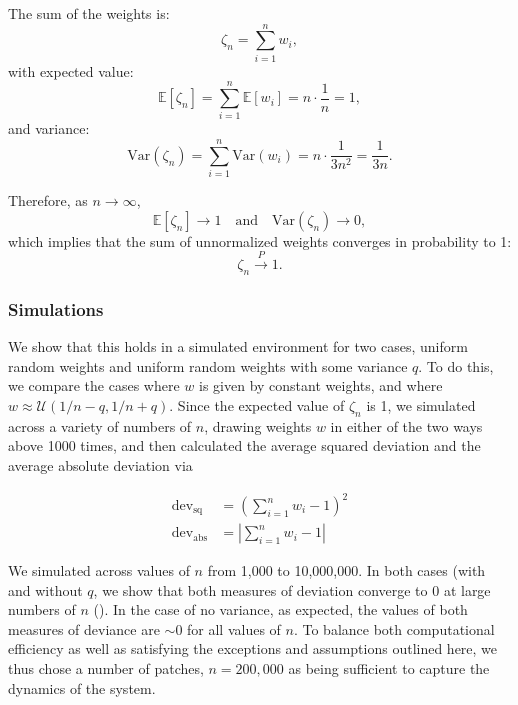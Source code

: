 The sum of the weights is:
\begin{equation}
\zeta_n = \sum_{i=1}^{n} w_i,
\end{equation}
with expected value:
\begin{equation}
\mathbb{E}[\zeta_n] = \sum_{i=1}^{n} \mathbb{E}[w_i] = n \cdot \frac{1}{n} = 1,
\end{equation}
and variance:
\begin{equation}
\text{Var}(\zeta_n) = \sum_{i=1}^{n} \text{Var}(w_i) = n \cdot \frac{1}{3n^2} = \frac{1}{3n}.
\end{equation}

Therefore, as \( n \to \infty \),
\begin{equation}
\mathbb{E}[\zeta_n] \to 1 \quad \text{and} \quad \text{Var}(\zeta_n) \to 0,
\end{equation}
which implies that the sum of unnormalized weights converges in probability to 1:
\begin{equation}
\zeta_n \xrightarrow{P} 1.
\end{equation}

\subsubsection*{Simulations}

We show that this holds in a simulated environment for two cases, uniform random weights and uniform random weights with some variance $q$. To do this, we compare the cases where $w$ is given by constant weights, and where $w \approx  \mathcal{U}(1/n-q,1/n+q)$. Since the expected value of $\zeta_n$ is 1, we simulated across a variety of numbers of $n$, drawing weights $w$ in either of the two ways above 1000 times, and then calculated the average squared deviation and the average absolute deviation via 

\begin{equation}
    \begin{aligned}
    \text{dev}_{\text{sq}} &= \left( \sum_{i=1}^n w_i - 1\right) ^ 2 \\ 
    \text{dev}_{\text{abs}} &= \left| \sum_{i=1}^n w_i - 1\right|
    \end{aligned}
    \label{eq:dev-measures}
\end{equation}

We simulated across values of $n$ from 1,000 to 10,000,000. In both cases (with and without $q$, we show that both measures of deviation converge to $0$ at large numbers of $n$ (). In the case of no variance, as expected, the values of both measures of deviance are $\sim 0$ for all values of $n$. To balance both computational efficiency as well as satisfying the exceptions and assumptions outlined here, we thus chose a number of patches, $n = 200,000$ as being sufficient to capture the dynamics of the system. 

